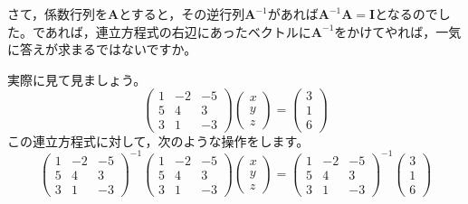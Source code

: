 \documentclass{ltjsbook}
\begin{document}
さて，係数行列を$\bm{A}$とすると，その逆行列$\bm{A}^{-1}$があれば$\bm{A}^{-1}\bm{A} = \bm{I}$となるのでした。であれば，連立方程式の右辺にあったベクトルに$\bm{A}^{-1}$をかけてやれば，一気に答えが求まるではないですか。

実際に見て見ましょう。
\[
    \begin{pmatrix} 1 & -2 & -5 \\
                5 & 4  & 3  \\
                3 & 1  & -3\end{pmatrix}
    \begin{pmatrix} x \\ y \\ z \end{pmatrix}
    =
    \begin{pmatrix} 3 \\ 1 \\ 6 \end{pmatrix}
\]
この連立方程式に対して，次のような操作をします。
\[
    \begin{pmatrix} 1 & -2 & -5 \\
                5 & 4  & 3  \\
                3 & 1  & -3\end{pmatrix}^{-1}
    \begin{pmatrix} 1 & -2 & -5 \\
                5 & 4  & 3  \\
                3 & 1  & -3\end{pmatrix}
    \begin{pmatrix} x \\ y \\ z \end{pmatrix}
    =
    \begin{pmatrix} 1 & -2 & -5 \\
                5 & 4  & 3  \\
                3 & 1  & -3\end{pmatrix}^{-1}
    \begin{pmatrix} 3 \\ 1 \\ 6 \end{pmatrix}
\]
\end{document}
